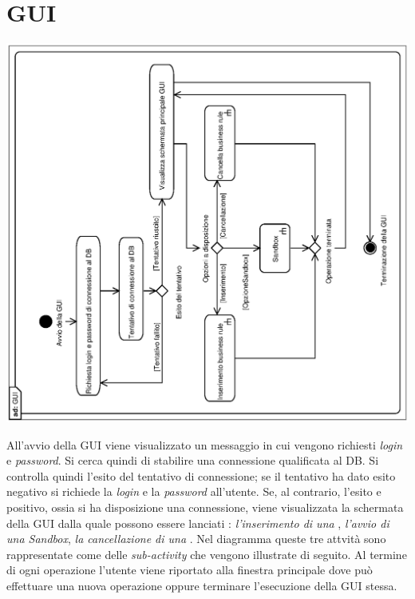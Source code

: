 \documentclass[11pt,titlepage,a4paper]{report}
\begin{document}
\section{GUI}
\begin{center}
 \includegraphics[width=1\textwidth, angle=-90]{GUI.eps}
\end{center}
All'avvio della GUI viene visualizzato un messaggio in cui vengono richiesti \textit{login} e \textit{password}. Si cerca quindi di stabilire una connessione qualificata al DB. 
Si controlla quindi l'esito del tentativo di connessione; se il tentativo ha dato esito negativo si richiede la \textit{login} e la
 \textit{password} all'utente. Se, al contrario, l'esito e positivo, ossia si ha disposizione una connessione, viene visualizzata la schermata della GUI dalla quale
 possono essere lanciati :\textit{ l'inserimento di una \br} , \textit{l'avvio di una Sandbox}, \textit{la cancellazione di una \br}.
Nel diagramma queste tre attvit\`a sono rappresentate come delle \textit{sub-activity} che vengono illustrate di seguito. Al termine di ogni operazione l'utente viene riportato alla finestra principale dove pu\`o effettuare una nuova operazione oppure terminare l'esecuzione della GUI stessa.
\end{document}
